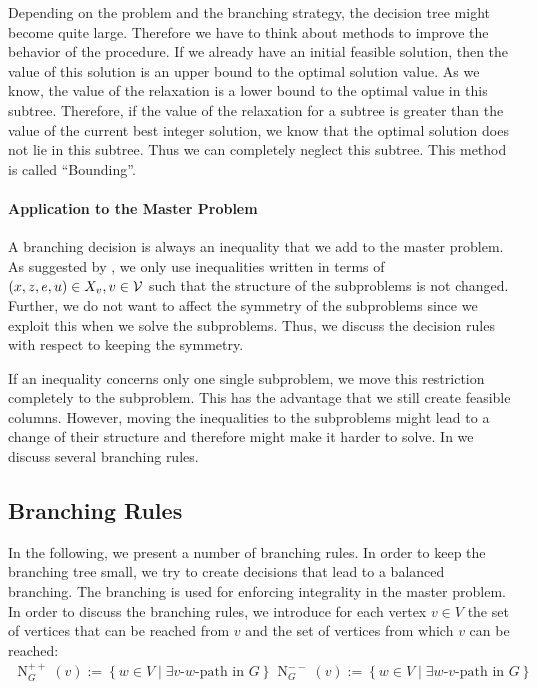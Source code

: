 Depending on the problem and the branching strategy, the decision tree might become quite large. Therefore we have to think about methods to improve the behavior of the procedure. If we already have an initial feasible solution, then the value of this solution is an upper bound to the optimal solution value. As we know, the value of the relaxation is a lower bound to the optimal value in this subtree. Therefore, if the value of the relaxation for a subtree is greater than the value of the current best integer solution, we know that the optimal solution does not lie in this subtree. Thus we can completely neglect this subtree. This method is called \enquote{Bounding}.

\paragraph{Application to the Master Problem} \parfill

A branching decision is always an inequality that we add to the master problem. As suggested by \cite{Kaiser}, we only use inequalities written in terms of ${(x,z,e,u)\in X_v}, {v\in\mathcal{V}}$ such that the structure of the subproblems is not changed. Further, we do not want to affect the symmetry of the subproblems since we exploit this when we solve the subproblems. Thus, we discuss the decision rules with respect to keeping the symmetry.

If an inequality concerns only one single subproblem, we move this restriction completely to the subproblem. This has the advantage that we still create feasible columns. However, moving the inequalities to the subproblems might lead to a change of their structure and therefore might make it harder to solve. In  we discuss several branching rules.


\subsection{Branching Rules}
\label{sec:branching_rules}

In the following, we present a number of branching rules. In order to keep the branching tree small, we try to create decisions that lead to a balanced branching. The branching is used for enforcing integrality in the master problem. In order to discuss the branching rules, we introduce for each vertex $v\in V$ the set of vertices that can be reached from $v$ and the set of vertices from which $v$ can be reached:  
\begin{align*}
	\operatorname{N}_G^{++}(v) := \left\{w\in V\mid\exists v \text{-} w \text{-path in } G\right\} && \operatorname{N}_G^{--}(v) := \left\{w\in V\mid\exists w \text{-} v \text{-path in } G\right\}
\end{align*}

